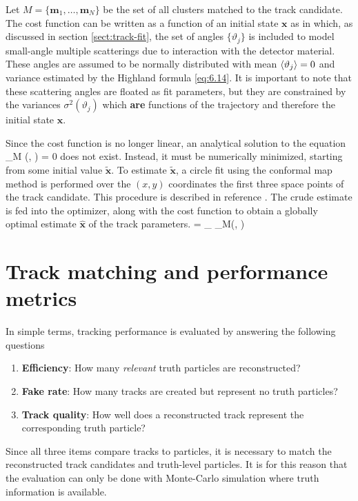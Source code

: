 Let $M=\{\mathbf{m}_1, \dotsc , \mathbf{m}_N\}$ be the set of all clusters matched to the track candidate. The cost function can be written as a function of an initial state $\mathbf{x}$ as
\beq
\label{eq:track-performance:5}
\eeq
in which, as discussed in section \ref{sect:track-fit}, the set of angles $\{\vartheta_j\}$  is included to model small-angle multiple scatterings due to interaction with the detector material. 
These angles are assumed to be normally distributed with mean $\expval{\vartheta_j}=0$ and variance estimated by the Highland formula \eqref{eq:6.14}. 
It is important to note that these scattering angles are floated as fit parameters, but they are constrained by the variances $\sigma^2(\vartheta_j)$ which \textbf{are} functions of the trajectory and therefore the initial state $\mathbf{x}$.

Since the cost function is no longer linear, an analytical solution to the equation 
\beq
\label{eq:track-performance:4-1}
\nabla{}_M (, {\vartheta}) = 0
\eeq
does not exist.
Instead, it must be numerically minimized, starting from some initial value $\tilde{\mathbf{x}}$.
To estimate $\tilde{\mathbf{x}}$, a circle fit using the conformal map method is performed over the $(x,y)$ coordinates the first three space points of the track candidate. 
This procedure is described in reference \cite{HANSROUL1988498}. 
The crude estimate is fed into the optimizer, along with the cost function to obtain a globally optimal estimate $\hat{\mathbf{x}}$ of the track parameters. 
\beq
\label{eq:track-performance:6}
 = \min_{} _M(, \vartheta)
\eeq


\section{Track matching and performance metrics}
\label{sect:track-match-metrics}

In simple terms, tracking performance is evaluated by answering the following questions
\begin{enumerate}
    \item \textbf{Efficiency}: How many \textit{relevant} truth particles are reconstructed?
    \item \textbf{Fake rate}: How many tracks are created but represent no truth particles?
    \item \textbf{Track quality}: How well does a reconstructed track represent the corresponding truth particle?
\end{enumerate}
Since all three items compare tracks to particles, it is necessary to match the reconstructed track candidates and truth-level particles. 
It is for this reason that the evaluation can only be done with Monte-Carlo simulation where truth information is available. 

